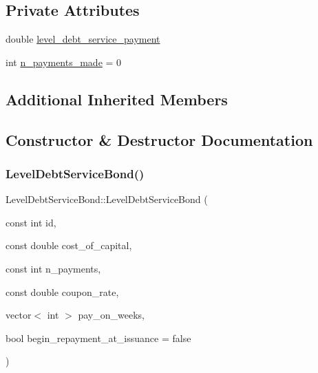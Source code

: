 \subsection*{Private Attributes}
\begin{DoxyCompactItemize}
\item 
double \mbox{\hyperlink{classLevelDebtServiceBond_a2af3b9ff7546bd002f78d07dbf696c64_a2af3b9ff7546bd002f78d07dbf696c64}{level\+\_\+debt\+\_\+service\+\_\+payment}}
\item 
int \mbox{\hyperlink{classLevelDebtServiceBond_ad1b8ba91ef3702a5eecfe3075fed0bc3_ad1b8ba91ef3702a5eecfe3075fed0bc3}{n\+\_\+payments\+\_\+made}} = 0
\end{DoxyCompactItemize}
\subsection*{Additional Inherited Members}


\subsection{Constructor \& Destructor Documentation}
\mbox{\label{classLevelDebtServiceBond_a71af87d057090bd2310a10df03b36fdf_a71af87d057090bd2310a10df03b36fdf}} 
\subsubsection{\texorpdfstring{Level\+Debt\+Service\+Bond()}{LevelDebtServiceBond()}}
{\footnotesize\ttfamily Level\+Debt\+Service\+Bond\+::\+Level\+Debt\+Service\+Bond (\begin{DoxyParamCaption}\item[{const int}]{id,  }\item[{const double}]{cost\+\_\+of\+\_\+capital,  }\item[{const int}]{n\+\_\+payments,  }\item[{const double}]{coupon\+\_\+rate,  }\item[{vector$<$ int $>$}]{pay\+\_\+on\+\_\+weeks,  }\item[{bool}]{begin\+\_\+repayment\+\_\+at\+\_\+issuance = {\ttfamily false} }\end{DoxyParamCaption})}

